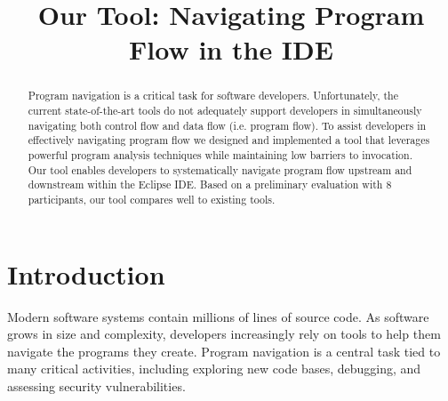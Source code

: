 \documentclass[conference]{IEEEtran}
\begin{document}
%
\title{Our Tool: Navigating Program Flow in the IDE}


\author{
}

\maketitle

\begin{abstract}
Program navigation is a critical task for software developers. 
Unfortunately, the current state-of-the-art tools do not adequately support developers in simultaneously navigating both control flow and data flow (i.e. program flow). 
To assist developers in effectively navigating program flow we designed and implemented a tool that leverages powerful program analysis techniques while maintaining low barriers to invocation.
Our tool enables developers to systematically navigate program flow upstream and downstream within the Eclipse IDE.
Based on a preliminary evaluation with 8 participants, our tool compares well to existing tools. 
\end{abstract}




\IEEEpeerreviewmaketitle



\section{Introduction}
Modern software systems contain millions of lines of source code. 
As software grows in size and complexity, developers increasingly rely on tools to help them navigate the programs they create. 
Program navigation is a central task tied to many critical activities, including exploring new code bases, debugging, and assessing security vulnerabilities. 
\end{document}
